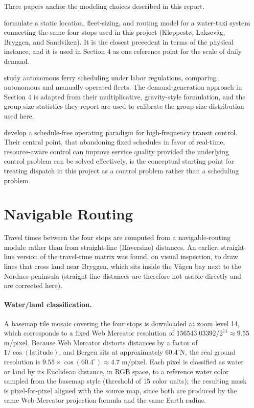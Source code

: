 \documentclass[11pt,a4paper]{article}
\begin{document}
Three papers anchor the modeling choices described in this report.

\citet{Gu2021} formulate a static location, fleet-sizing, and routing model for a water-taxi system connecting the same four stops used in this project (Kleppestø, Laksevåg, Bryggen, and Sandviken). It is the closest precedent in terms of the physical instance, and it is used in Section 4 as one reference point for the scale of daily demand.

\citet{Braathen2024} study autonomous ferry scheduling under labor regulations, comparing autonomous and manually operated fleets. The demand-generation approach in Section 4 is adapted from their multiplicative, gravity-style formulation, and the group-size statistics they report are used to calibrate the group-size distribution used here.

\citet{SanchezMartinez2017} develop a schedule-free operating paradigm for high-frequency transit control. Their central point, that abandoning fixed schedules in favor of real-time, resource-aware control can improve service quality provided the underlying control problem can be solved effectively, is the conceptual starting point for treating dispatch in this project as a control problem rather than a scheduling problem.

\section{Navigable Routing}
\label{sec:ruteo}

Travel times between the four stops are computed from a navigable-routing module rather than from straight-line (Haversine) distances. An earlier, straight-line version of the travel-time matrix was found, on visual inspection, to draw lines that cross land near Bryggen, which sits inside the Vågen bay next to the Nordnes peninsula (straight-line distances are therefore not usable directly and are corrected here).

\paragraph{Water/land classification.} A basemap tile mosaic covering the four stops is downloaded at zoom level 14, which corresponds to a fixed Web Mercator resolution of $156543.03392 / 2^{14} \approx 9.55$ m/pixel. Because Web Mercator distorts distances by a factor of $1/\cos(\text{latitude})$, and Bergen sits at approximately $60.4^{\circ}$N, the real ground resolution is $9.55 \times \cos(60.4^{\circ}) \approx 4.7$ m/pixel. Each pixel is classified as water or land by its Euclidean distance, in RGB space, to a reference water color sampled from the basemap style (threshold of 15 color units); the resulting mask is pixel-for-pixel aligned with the source map, since both are produced by the same Web Mercator projection formula and the same Earth radius.
\end{document}

